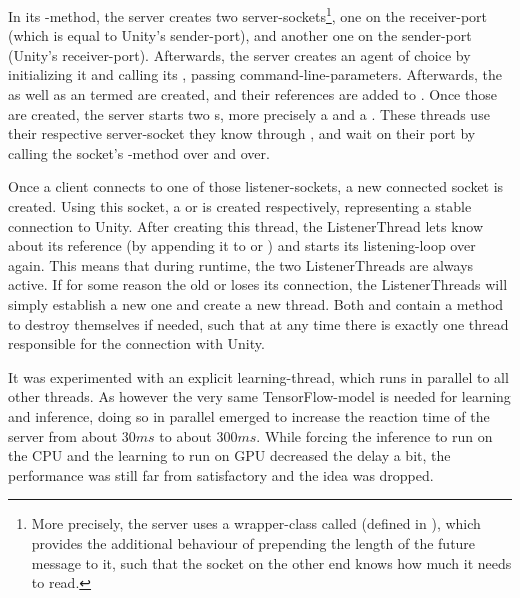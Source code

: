 In its -method, the server creates two server-sockets\footnote{More precisely, the server uses a wrapper-class called  (defined in ), which provides the additional behaviour of prepending the length of the future message to it, such that the socket on the other end knows how much it needs to read.}, one on the receiver-port (which is equal to Unity's sender-port), and another one on the sender-port (Unity's receiver-port). Afterwards, the server creates an agent of choice by initializing it and calling its , passing command-line-parameters. Afterwards, the   as well as an  termed  are created, and their references are added to . Once those are created, the server starts two s, more precisely a  and a . These threads use their respective server-socket they know through , and wait on their port by calling the socket's -method over and over.

Once a client connects to one of those listener-sockets, a new connected socket is created. Using this socket, a  or  is created respectively, representing a stable connection to Unity. After creating this thread, the ListenerThread lets  know about its reference (by appending it to  or ) and starts its listening-loop over again. This means that during runtime, the two ListenerThreads are always active. If for some reason the old  or  loses its connection, the ListenerThreads will simply establish a new one and create a new thread. Both  and   contain a method to destroy themselves if needed, such that at any time there is exactly one thread responsible for the connection with Unity.

It was experimented with an explicit learning-thread, which runs in parallel to all other threads. As however the very same TensorFlow-model is needed for learning and inference, doing so in parallel emerged to increase the reaction time of the server from about $30ms$ to about $300ms$. While forcing the inference to run on the CPU and the learning to run on GPU decreased the delay a bit, the performance was still far from satisfactory and the idea was dropped.

